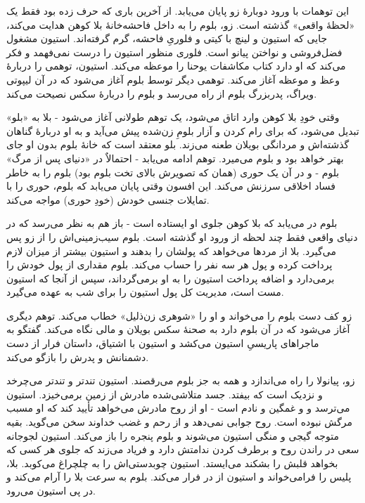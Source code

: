 \documentclass[12pt]{book}
\begin{document}
    این توهمات با ورود دوبارۀ زو پایان می‌یابد. از آخرین باری که حرف زده بود فقط یک «لحظۀ واقعی» گذشته است. زو، بلوم را به داخل فاحشه‌خانۀ بلا کوهن هدایت می‌کند، جایی که استیون و لینچ با کیتی و فلوریِ فاحشه، گرم گرفته‌اند. استیون مشغول فضل‌فروشی و نواختن پیانو است. فلوری منظور استیون را درست نمی‌فهمد و فکر می‌کند که او دارد کتاب مکاشفات یوحنا را موعظه می‌کند. استیون، توهمی را دربارۀ وعظ و موعظه آغاز می‌کند. توهمی دیگر توسط بلوم آغاز می‌شود که در آن لیپوتی ویراگ، پدربزرگ بلوم از راه می‌رسد و بلوم را دربارۀ سکس نصیحت می‌کند.

    وقتی خودِ بلا کوهن وارد اتاق می‌شود، یک توهم طولانی آغاز می‌شود - بلا به «بلو» تبدیل می‌شود، که برای رام کردن و آزار بلومِ زن‌شده پیش می‌آید و به او دربارۀ گناهان گذشته‌اش و مردانگی بویلان طعنه می‌زند. بلو معتقد است که خانۀ بلوم بدون او جای بهتر خواهد بود و بلوم می‌میرد. توهم ادامه می‌یابد - احتمالاٌ در «دنیای پس از مرگ» بلوم - و در آن یک حوری (همان که تصویرش بالای تخت بلوم بود) بلوم را به خاطر فساد اخلاقی سرزنش می‌کند. این افسون وقتی پایان می‌یابد که بلوم، حوری را با تمایلات جنسی خودش (خودِ حوری) مواجه می‌کند.

    بلوم در می‌یابد که بلا کوهن جلوی او ایستاده است - باز هم به نظر می‌رسد که در دنیای واقعی فقط چند لحظه از ورود او گذشته است. بلوم سیب‌زمینی‌اش را از زو پس می‌گیرد. بلا از مردها می‌خواهد که پولشان را بدهند و استیون بیشتر از میزان لازم پرداخت کرده و پول هر سه نفر را حساب می‌کند. بلوم مقداری از پول خودش را برمی‌دارد و اضافه پرداخت استیون را به او برمی‌گرداند، سپس از آنجا که استیون مست است، مدیریت کل پول استیون را برای شب به عهده می‌گیرد.

    زو کف دست بلوم را می‌خواند و او را «شوهری زن‌ذلیل» خطاب می‌کند. توهم دیگری آغاز می‌شود که در آن بلوم دارد به صحنۀ سکس بویلان و مالی نگاه می‌کند. گفتگو به ماجراهای پاریسیِ استیون می‌کشد و استیون با اشتیاق، داستان فرار از دست دشمنانش و پدرش را بازگو می‌کند.

    زو، پیانولا را راه می‌اندازد و همه به جز بلوم می‌رقصند. استیون تندتر و تندتر می‌چرخد و نزدیک است که بیفتد. جسد متلاشی‌شده مادرش از زمین برمی‌خیزد. استیون می‌ترسد و و غمگین و نادم است - او از روح مادرش می‌خواهد تأیید کند که او مسبب مرگش نبوده است. روح جوابی نمی‌دهد و از رحم و غضب خداوند سخن می‌گوید. بقیه متوجه گیجی و منگی استیون می‌شوند و بلوم پنجره را باز می‌کند. استیون لجوجانه سعی در راندن روح و برطرف کردن ندامتش دارد و فریاد می‌زند که جلوی هر کسی که بخواهد قلبش را بشکند می‌ایستد. استیون چوبدستی‌اش را به چلچراغ می‌کوبد. بلا، پلیس را فرامی‌خواند و استیون از در فرار می‌کند. بلوم به سرعت بلا را آرام می‌کند و در پی استیون می‌رود.
\end{document}
